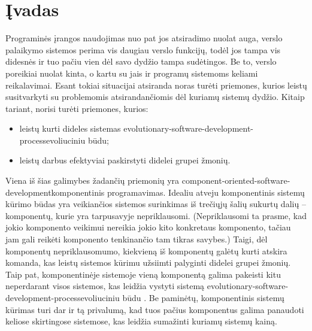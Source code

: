 \chapter{Įvadas}

Programinės įrangos naudojimas nuo pat jos atsiradimo nuolat auga,
verslo palaikymo sistemos perima vis daugiau verslo funkcijų, todėl
jos tampa vis didesnės ir tuo pačiu vien dėl savo dydžio tampa
sudėtingos. Be to, verslo poreikiai nuolat kinta, o kartu su jais
ir programų sistemoms keliami reikalavimai. Esant tokiai situacijai
atsiranda noras turėti priemones, kurios leistų susitvarkyti
su problemomis atsirandančiomis dėl kuriamų sistemų dydžio. Kitaip
tariant, norisi turėti priemones, kurios:
\begin{itemize}
  \item leistų kurti dideles sistemas
    \gls{evolutionary-software-development-process}{evoliuciniu būdu};
  \item leistų darbus efektyviai paskirstyti didelei grupei žmonių.
\end{itemize}

Viena iš šias galimybes žadančių priemonių yra
\gls{component-oriented-software-development}{komponentinis programavimas}.
Idealiu atveju komponentinis sistemų kūrimo būdas yra veikiančios
sistemos surinkimas iš trečiųjų šalių sukurtų dalių –
komponentų, kurie yra tarpusavyje nepriklausomi. (Nepriklausomi ta
prasme, kad jokio komponento veikimui nereikia jokio kito konkretaus
komponento, tačiau jam gali reikėti komponento tenkinančio tam
tikras savybes.) Taigi, dėl komponentų nepriklausomumo, kiekvieną iš
komponentų galėtų kurti atskira komanda, kas leistų sistemos kūrimu
užsiimti palyginti didelei grupei žmonių. Taip pat, komponentinėje
sistemoje vieną komponentą galima pakeisti kitu neperdarant visos
sistemos, kas leidžia vystyti sistemą
\gls{evolutionary-software-development-process}{evoliuciniu būdu}%
\cite[6]{cs-beyond-object-oriented-programming}. Be paminėtų,
komponentinis sistemų kūrimas turi dar ir tą privalumą, kad tuos
pačius komponentus galima panaudoti keliose skirtingose sistemose, kas
leidžia sumažinti kuriamų sistemų
kainą\cite[6]{cs-beyond-object-oriented-programming}.

